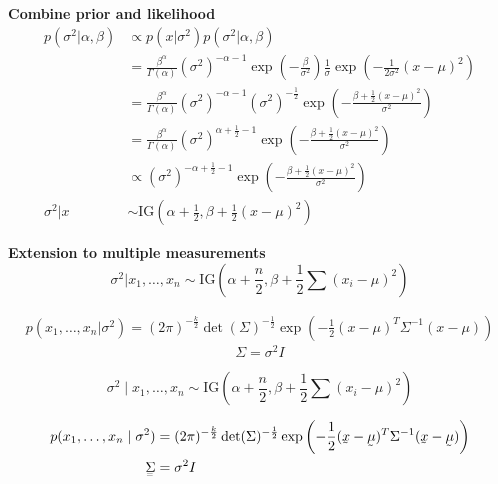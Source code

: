 \documentclass[12pt]{article}
\begin{document}
\begin{appendices}
\textbf{Combine prior and likelihood}\\
\begin{equation*}
\begin{aligned}
p(\sigma^2 | \alpha, \beta) &\propto p(x|\sigma^2) p(\sigma^2| \alpha,\beta)\\
&=\frac{\beta^\alpha}{\Gamma(\alpha)} (\sigma^2)^{-\alpha - 1} \exp\left(-\frac{\beta}{\sigma^2}\right) \frac{1}{\sigma} \exp\left(-\frac{1}{2\sigma^2} (x - \mu)^2 \right)\\
&=\frac{\beta^\alpha}{\Gamma(\alpha)} (\sigma^2)^{-\alpha - 1}(\sigma^2)^{-\frac{1}{2}} \exp\left(-\frac{\beta+\frac{1}{2}(x-\mu)^2}{\sigma^2}\right)\\
&=\frac{\beta^\alpha}{\Gamma(\alpha)} (\sigma^2)^{\alpha +\frac{1}{2} -1}\exp\left(-\frac{\beta+\frac{1}{2}(x-\mu)^2}{\sigma^2}\right)\\
&\propto (\sigma^2)^{-\alpha +\frac{1}{2}-1}\exp\left(-\frac{\beta+\frac{1}{2}(x-\mu)^2}{\sigma^2}\right) \\
\sigma^2 | x &\sim \text{IG}\left(\alpha + \frac{1}{2}, \beta + \frac{1}{2} (x - \mu)^2 \right)
\end{aligned}
\end{equation*}

\textbf{Extension to multiple measurements}
\begin{equation*}
    \sigma^2 | x_1, \ldots, x_n \sim \text{IG}\left(\alpha + \frac{n}{2}, \beta + \frac{1}{2} \sum(x_i - \mu)^2 \right)
\end{equation*}

\begin{equation*}
    \begin{aligned}
        p(x_1, \ldots, x_n|\sigma^2 )= (2\pi)^{-\frac{k}{2}}\det\left(\Sigma\right)^{-\frac{1}{2}}\exp\left(-\frac{1}{2}(x-\mu)^T\Sigma^{-1}(x-\mu)\right)
    \end{aligned}
\end{equation*}
\[\Sigma=\sigma^2I\]



\begin{equation*}
    \sigma^2 \mid x_1, \ldots, x_n \sim \text{IG}\left(\alpha + \frac{n}{2}, \beta + \frac{1}{2} \sum (x_i - \mu)^2 \right)
\end{equation*}

\begin{equation*}
    \begin{aligned}
        p(x_1, \ldots, x_n \mid \sigma^2) &= (2\pi)^{-\frac{k}{2}} \det(\Sigma)^{-\frac{1}{2}} \exp\left(-\frac{1}{2}(\underaccent{\tilde}{x} - \underaccent{\tilde}\mu)^T \Sigma^{-1} (\underaccent{\tilde}x - \underaccent{\tilde}\mu)\right)\\
        \underaccent{=}\Sigma &= \sigma^2 I
    \end{aligned}
\end{equation*}


\end{appendices}
\end{document}
